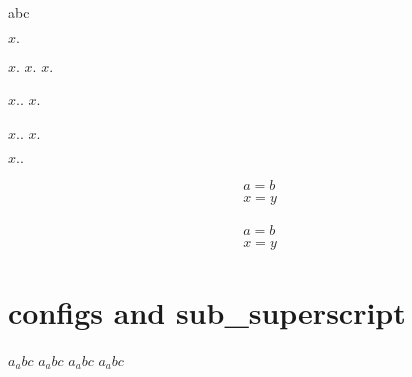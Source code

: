 abc

$x.$

$x.$
$x.$
$x.$

$x..$
$x.$

$x..$
$x.$

$x..$

\begin {align}
a = b \\
x = y
\end{align}

\begin {align}
a = b \\
x = y
\end{align}

\section{configs and sub_superscript}
$a_ abc $
$a_ abc $
$a_abc$
$a_abc$


